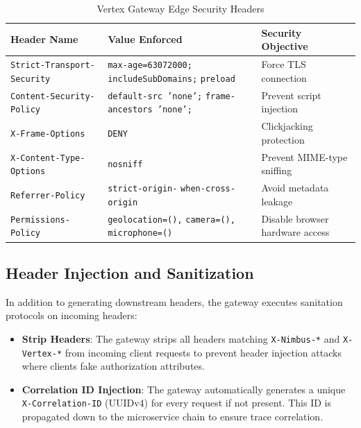 \begin{table}[htbp]
\centering
\caption{Vertex Gateway Edge Security Headers}
\label{tab:security_headers}
\begin{tabularx}{\textwidth}{l X l}
\toprule
\textbf{Header Name} & \textbf{Value Enforced} & \textbf{Security Objective} \\
\midrule
\texttt{Strict-Transport-Security} & \texttt{max-age=63072000;} \allowbreak \texttt{includeSubDomains;} \allowbreak \texttt{preload} & Force TLS connection \\
\texttt{Content-Security-Policy} & \texttt{default-src 'none';} \allowbreak \texttt{frame-ancestors 'none';} & Prevent script injection \\
\texttt{X-Frame-Options} & \texttt{DENY} & Clickjacking protection \\
\texttt{X-Content-Type-Options} & \texttt{nosniff} & Prevent MIME-type sniffing \\
\texttt{Referrer-Policy} & \texttt{strict-origin-} \allowbreak \texttt{when-cross-origin} & Avoid metadata leakage \\
\texttt{Permissions-Policy} & \texttt{geolocation=(),} \allowbreak \texttt{camera=(),} \allowbreak \texttt{microphone=()} & Disable browser hardware access \\
\bottomrule
\end{tabularx}
\end{table}

\subsection{Header Injection and Sanitization}
In addition to generating downstream headers, the gateway executes sanitation protocols on incoming headers:
\begin{itemize}
    \item \textbf{Strip Headers}: The gateway strips all headers matching \texttt{X-Nimbus-*} and \texttt{X-Vertex-*} from incoming client requests to prevent header injection attacks where clients fake authorization attributes.
    \item \textbf{Correlation ID Injection}: The gateway automatically generates a unique \texttt{X-Correlation-ID} (UUIDv4) for every request if not present. This ID is propagated down to the microservice chain to ensure trace correlation.
\end{itemize}
